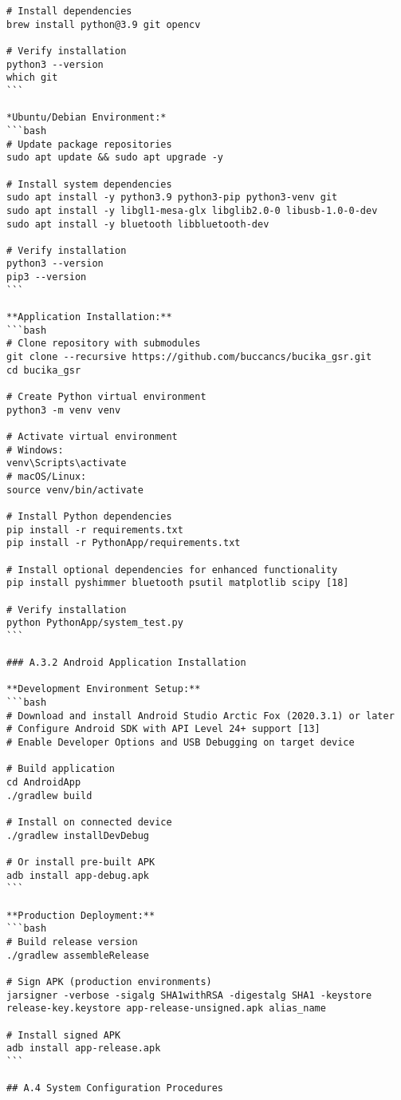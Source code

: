 \begin{verbatim}
# Install dependencies
brew install python@3.9 git opencv

# Verify installation
python3 --version
which git
```

*Ubuntu/Debian Environment:*
```bash
# Update package repositories
sudo apt update && sudo apt upgrade -y

# Install system dependencies
sudo apt install -y python3.9 python3-pip python3-venv git
sudo apt install -y libgl1-mesa-glx libglib2.0-0 libusb-1.0-0-dev
sudo apt install -y bluetooth libbluetooth-dev

# Verify installation
python3 --version
pip3 --version
```

**Application Installation:**
```bash
# Clone repository with submodules
git clone --recursive https://github.com/buccancs/bucika_gsr.git
cd bucika_gsr

# Create Python virtual environment
python3 -m venv venv

# Activate virtual environment
# Windows:
venv\Scripts\activate
# macOS/Linux:
source venv/bin/activate

# Install Python dependencies
pip install -r requirements.txt
pip install -r PythonApp/requirements.txt

# Install optional dependencies for enhanced functionality
pip install pyshimmer bluetooth psutil matplotlib scipy [18]

# Verify installation
python PythonApp/system_test.py
```

### A.3.2 Android Application Installation

**Development Environment Setup:**
```bash
# Download and install Android Studio Arctic Fox (2020.3.1) or later
# Configure Android SDK with API Level 24+ support [13]
# Enable Developer Options and USB Debugging on target device

# Build application
cd AndroidApp
./gradlew build

# Install on connected device
./gradlew installDevDebug

# Or install pre-built APK
adb install app-debug.apk
```

**Production Deployment:**
```bash
# Build release version
./gradlew assembleRelease

# Sign APK (production environments)
jarsigner -verbose -sigalg SHA1withRSA -digestalg SHA1 -keystore release-key.keystore app-release-unsigned.apk alias_name

# Install signed APK
adb install app-release.apk
```

## A.4 System Configuration Procedures


\end{verbatim}
